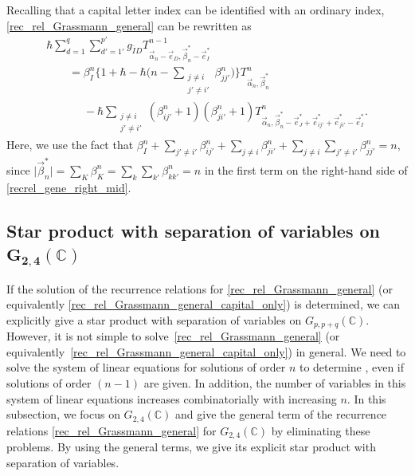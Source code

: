 \documentclass[pdftex]{sigma}
\numberwithin{equation}{section}
\begin{document}
Recalling that a capital letter index can be identified with an ordinary index, \eqref{rec_rel_Grassmann_general} can be rewritten as
\begin{gather}
 \hbar
 \sum_{d=1}^{q}
 \sum_{d'=1'}^{p'}
 g_{\overline{I}D}
 T^{n-1}_{\vec{\alpha}_{n}-\vec{e}_{D},\vec{\beta}_{n}^{\ast}-\vec{e}_{I}^{\ast}}
\nonumber
 \\
 \qquad=
 \beta_{I}^{n}
 \Biggl\{
 1
 +
 \hbar
 -
 \hbar
 \biggl(
 n
 -
 \sum_{
 \substack{
 j
 \neq
 i
 \\
 j'
 \neq
 i'}
 }
 \beta_{jj'}^{n}
 \biggr)
 \Biggr\}
 T^{n}_{\vec{\alpha}_{n},\vec{\beta}_{n}^{\ast}}\nonumber\\
 \phantom{ \qquad=}{}
 -
 \hbar
 \sum_{
 \substack{
 j
 \neq
 i
 \\
 j'
 \neq
 i'}
 }
 (
 \beta_{ij'}^{n}
 +
 1
 )
 (
 \beta_{ji'}^{n}
 +
 1
 )
 T^{n}_{\vec{\alpha}_{n},\vec{\beta}_{n}^{\ast}-\vec{e}_{J}^{\ast}
 +\vec{e}_{ij'}^{\ast}+\vec{e}_{ji'}^{\ast}-\vec{e}_{I}^{\ast}}.
 \label{rec_rel_Grassmann_general_capital_only}
\end{gather}
Here, we use the fact that
$
 \beta_{I}^{n}
 +
 \sum_{
 j'
 \neq
 i'
 }
 \beta_{ij'}^{n}
 +
 \sum_{
 j
 \neq
 i
 }
 \beta_{ji'}^{n}
 +
 \sum_{
 j
 \neq
 i
 }
 \sum_{
 j'
 \neq
 i'
 }
 \beta_{jj'}^{n}
 =
 n$,
since
$
\big|
\vec{\beta}_{n}^{\ast}
\big|
=
\sum_{K}
\beta_{K}^{n}
=
\sum_{k}
\sum_{k'}
\beta_{kk'}^{n}
=
n
$
in the first term on the right-hand side of \eqref{recrel_gene_right_mid}.

\subsection[Star product with separation of variables on G\_\{2,4\}(C)]{Star product with separation of variables on $\boldsymbol{G_{2,4}(\mathbb{C})}$}
\label{G24_star_prd}

If the solution of the recurrence relations for \eqref{rec_rel_Grassmann_general} (or equivalently \eqref{rec_rel_Grassmann_general_capital_only}) is determined, we can explicitly give a star product with separation of variables on
$ G_{p,p+q}(\mathbb{C})$.
However, it is not simple to solve~\eqref{rec_rel_Grassmann_general} (or equivalently~\eqref{rec_rel_Grassmann_general_capital_only}) in general. We need to solve the system of linear equations for solutions of order $n$ to determine , even if solutions of order $(n-1)$ are given. In addition, the number of variables in this system of linear equations increases combinatorially with increasing $n$. In this subsection, we focus on $G_{2,4}(\mathbb{C})$ and give the general term of the recurrence relations \eqref{rec_rel_Grassmann_general} for $G_{2,4}(\mathbb{C})$ by eliminating these problems. By using the general terms, we give its explicit star product with separation of variables.
\end{document}
